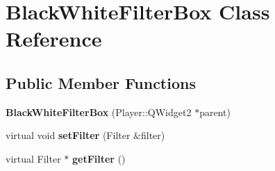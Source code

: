 \hypertarget{classBlackWhiteFilterBox}{}\section{Black\+White\+Filter\+Box Class Reference}
\label{classBlackWhiteFilterBox}
\subsection*{Public Member Functions}
\begin{DoxyCompactItemize}
\item 
\hypertarget{classBlackWhiteFilterBox_a3a17bc981aeadc0388bb4c8d363fa7a4}{}{\bfseries Black\+White\+Filter\+Box} (Player\+::\+Q\+Widget2 $\ast$parent)\label{classBlackWhiteFilterBox_a3a17bc981aeadc0388bb4c8d363fa7a4}

\item 
\hypertarget{classBlackWhiteFilterBox_a09e99b0db09b8468ce7d7e0f98293ac5}{}virtual void {\bfseries set\+Filter} (Filter \&filter)\label{classBlackWhiteFilterBox_a09e99b0db09b8468ce7d7e0f98293ac5}

\item 
\hypertarget{classBlackWhiteFilterBox_ad7b14770615490d1445c958c79fd3adb}{}virtual Filter $\ast$ {\bfseries get\+Filter} ()\label{classBlackWhiteFilterBox_ad7b14770615490d1445c958c79fd3adb}

\end{DoxyCompactItemize}
